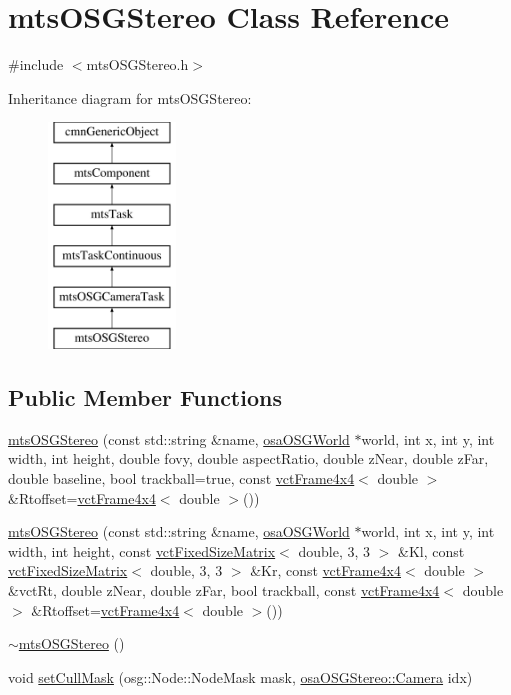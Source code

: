\hypertarget{classmts_o_s_g_stereo}{}\section{mts\+O\+S\+G\+Stereo Class Reference}
\label{classmts_o_s_g_stereo}


{\ttfamily \#include $<$mts\+O\+S\+G\+Stereo.\+h$>$}

Inheritance diagram for mts\+O\+S\+G\+Stereo\+:\begin{figure}[H]
\begin{center}
\leavevmode
\includegraphics[height=6.000000cm]{d2/daf/classmts_o_s_g_stereo}
\end{center}
\end{figure}
\subsection*{Public Member Functions}
\begin{DoxyCompactItemize}
\item 
\hyperlink{classmts_o_s_g_stereo_a87013e678b9113ab48c783e037c36050}{mts\+O\+S\+G\+Stereo} (const std\+::string \&name, \hyperlink{classosa_o_s_g_world}{osa\+O\+S\+G\+World} $\ast$world, int x, int y, int width, int height, double fovy, double aspect\+Ratio, double z\+Near, double z\+Far, double baseline, bool trackball=true, const \hyperlink{classvct_frame4x4}{vct\+Frame4x4}$<$ double $>$ \&Rtoffset=\hyperlink{classvct_frame4x4}{vct\+Frame4x4}$<$ double $>$())
\item 
\hyperlink{classmts_o_s_g_stereo_a9eaa1091a4aafdd0100a5b8b9c2891c5}{mts\+O\+S\+G\+Stereo} (const std\+::string \&name, \hyperlink{classosa_o_s_g_world}{osa\+O\+S\+G\+World} $\ast$world, int x, int y, int width, int height, const \hyperlink{classvct_fixed_size_matrix}{vct\+Fixed\+Size\+Matrix}$<$ double, 3, 3 $>$ \&Kl, const \hyperlink{classvct_fixed_size_matrix}{vct\+Fixed\+Size\+Matrix}$<$ double, 3, 3 $>$ \&Kr, const \hyperlink{classvct_frame4x4}{vct\+Frame4x4}$<$ double $>$ \&vct\+Rt, double z\+Near, double z\+Far, bool trackball, const \hyperlink{classvct_frame4x4}{vct\+Frame4x4}$<$ double $>$ \&Rtoffset=\hyperlink{classvct_frame4x4}{vct\+Frame4x4}$<$ double $>$())
\item 
\hyperlink{classmts_o_s_g_stereo_a271f81e88703fa48660c5d96a64c48c2}{$\sim$mts\+O\+S\+G\+Stereo} ()
\item 
void \hyperlink{classmts_o_s_g_stereo_a2c8d52e22a7f9f39303d899a9d2e1cc5}{set\+Cull\+Mask} (osg\+::\+Node\+::\+Node\+Mask mask, \hyperlink{classosa_o_s_g_stereo_a6f3072fa8cc1d46fcedff6b2d497f396}{osa\+O\+S\+G\+Stereo\+::\+Camera} idx)
\end{DoxyCompactItemize}
